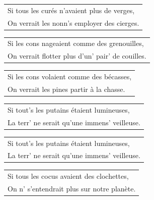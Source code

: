 \documentclass[a4paper, 14pt]{extarticle}
\begin{document}
\begin{flushleft}
\begin{tabularx}{0.8\textwidth} {
   >{\raggedright\arraybackslash}X}
Si tous les curés n’avaient plus de verges,\\
On verrait les nonn’s employer des cierges.\\
\end{tabularx}
\end{flushleft}\begin{flushleft}
\begin{tabularx}{0.8\textwidth} {
   >{\raggedright\arraybackslash}X}
Si les cons nageaient comme des grenouilles,\\
On verrait flotter plus d’un’ pair’ de couilles.\\
\end{tabularx}
\end{flushleft}\begin{flushleft}
\begin{tabularx}{0.8\textwidth} {
   >{\raggedright\arraybackslash}X}
Si les cons volaient comme des bécasses,\\
On verrait les pines partir à la chasse.\\
\end{tabularx}
\end{flushleft}\begin{flushleft}
\begin{tabularx}{0.8\textwidth} {
   >{\raggedright\arraybackslash}X}
Si tout’s les putains étaient lumineuses,\\
La terr’ ne serait qu’une immens’ veilleuse.\\
\end{tabularx}
\end{flushleft}
\begin{flushleft}
\begin{tabularx}{0.8\textwidth} {
   >{\raggedright\arraybackslash}X}
Si tout’s les putains étaient lumineuses,\\
La terr’ ne serait qu’une immens’ veilleuse.\\
\end{tabularx}
\end{flushleft}
\begin{flushleft}
\begin{tabularx}{0.8\textwidth} {
   >{\raggedright\arraybackslash}X}
Si tous les cocus avaient des clochettes,\\
On n’ s’entendrait plus sur notre planète.\\
\end{tabularx}
\end{flushleft}
\end{document}
